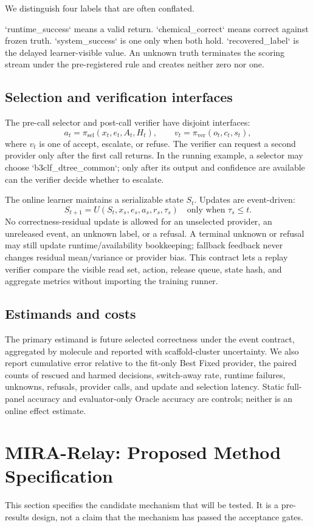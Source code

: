 \documentclass[sigconf,anonymous]{aamas}
\begin{document}
We distinguish four labels that are often conflated.\par
`runtime\_success` means a valid return. `chemical\_correct` means correct against frozen truth. `system\_success` is one only when both hold. `recovered\_label` is the delayed learner-visible value. An unknown truth terminates the scoring stream under the pre-registered rule and creates neither zero nor one.

\subsection{Selection and verification interfaces}
The pre-call selector and post-call verifier have disjoint interfaces:
$$
a_t=\pi_{\mathrm{sel}}(x_t,e_t,A_t,H_t),\qquad v_t=\pi_{\mathrm{ver}}(o_t,c_t,s_t),
$$
where $v_t$ is one of accept, escalate, or refuse. The verifier can request a second provider only after the first call returns. In the running example, a selector may choose `b3clf\_dtree\_common`; only after its output and confidence are available can the verifier decide whether to escalate.

The online learner maintains a serializable state $S_t$. Updates are event-driven:
$$
S_{t+1}=U(S_t,x_s,e_s,a_s,r_s,\tau_s)\quad\text{only when }\tau_s\leq t.
$$
No correctness-residual update is allowed for an unselected provider, an unreleased event, an unknown label, or a refusal. A terminal unknown or refusal may still update runtime/availability bookkeeping; fallback feedback never changes residual mean/variance or provider bias. This contract lets a replay verifier compare the visible read set, action, release queue, state hash, and aggregate metrics without importing the training runner.

\subsection{Estimands and costs}
The primary estimand is future selected correctness under the event contract, aggregated by molecule and reported with scaffold-cluster uncertainty. We also report cumulative error relative to the fit-only Best Fixed provider, the paired counts of rescued and harmed decisions, switch-away rate, runtime failures, unknowns, refusals, provider calls, and update and selection latency. Static full-panel accuracy and evaluator-only Oracle accuracy are controls; neither is an online effect estimate.

\section{MIRA-Relay: Proposed Method Specification}
This section specifies the candidate mechanism that will be tested. It is a pre-results design, not a claim that the mechanism has passed the acceptance gates.
\end{document}
